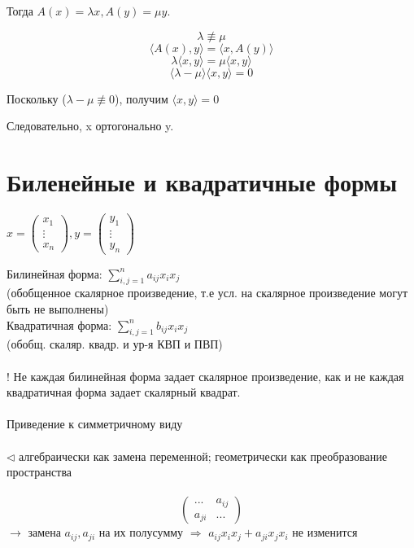 \documentclass[12pt]{article}
\begin{document}
    Тогда $A(x) = \lambda x, A(y) = \mu y$.

    \[
        \lambda \not \equiv \mu
    \]
    \[
        \langle A(x), y \rangle = \langle x, A(y) \rangle
    \]
    \[
        \lambda \langle x, y\rangle = \mu \langle x, y\rangle
    \]
    \[
        \langle \lambda - \mu\rangle\langle x, y\rangle = 0
    \]

    Поскольку ($\lambda - \mu \not\equiv 0$), получим $\langle x, y\rangle = 0$

    Следовательно, x ортогонально y.

    \section{Биленейные и квадратичные формы}

$x =
\begin{pmatrix}
    x_1    \\
    \vdots \\
    x_n
\end{pmatrix},
y =
\begin{pmatrix}
    y_1    \\
    \vdots \\
    y_n
\end{pmatrix}$

    Билинейная форма: \(\sum\limits_{i,j=1}^n a_{ij}x_ix_j\)\\
    (обобщенное скалярное произведение, т.е усл. на скалярное произведение могут быть не выполнены)\\
    Квадратичная форма: \(\sum\limits_{i,j=1}^n b_{ij}x_ix_j\)\\
    (обобщ. скаляр. квадр. и ур-я КВП и ПВП)\\\\
    ! Не каждая билинейная форма задает скалярное произведение, как и не каждая квадратичная форма задает скалярный квадрат. \\\\
    Приведение к симметричному виду\\\\
    \(\triangleleft\) алгебраически как замена переменной; геометрически как преобразование пространства\\\\
    \[
        \begin{pmatrix}
            ...    & a_{ij} \\
            a_{ji} & ...
        \end{pmatrix}
    \]
$\rightarrow$ замена $a_{ij}, a_{ji}$ на их полусумму $\Rightarrow$
$a_{ij}x_ix_j + a_{ji}x_jx_i$ не изменится\\\\
\end{document}
